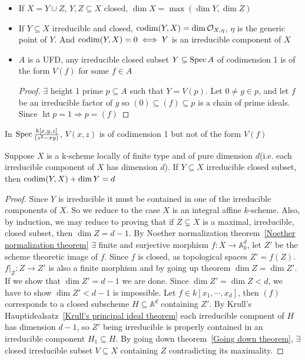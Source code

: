 \documentclass[main]{subfiles}
\begin{document}
\begin{itemize}
\item If $X=Y\cup Z$, $Y,Z\subseteq X$ closed, $\dim X=\max(\dim Y,\dim Z)$
\item If $Y\subseteq X$ irreducible and closed, $\operatorname{codim}(Y,X)=\dim\mathcal O_{X,\eta}$, $\eta$ is the generic point of $Y$. And $\operatorname{codim}(Y,X)=0\iff Y$ is an irreducible component of $X$
\item $A$ is a UFD, any irreducible closed subset $Y\subseteq\operatorname{Spec} A$ of codimension 1 is of the form $V(f)$ for some $f\in A$
\begin{proof}
$\exists$ height 1 prime $p\subseteq A$ such that $Y=V(p)$. Let $0\neq g\in p$, and let $f$ be an irreducible factor of $g$ so $(0)\subseteq(f)\subseteq p$ is a chain of prime ideals. Since $\operatorname{ht}p=1\Rightarrow p=(f)$
\end{proof}
\end{itemize}

\begin{example}
In $\operatorname{Spec}\frac{k[x,y,z]}{(z^2-xy)}$, $V(x,z)$ is of codimension 1 but not of the form $V(f)$
\end{example}

\clubsuit\quad  Suppose $X$ is a k-scheme locally of finite type and of pure dimension $d$(i.e. each irreducible component of $X$ has dimension $d$). If $Y\subseteq X$ irreducible closed subset, then $\operatorname{codim}(Y,X)+\dim Y=d$
\begin{proof}
Since $Y$ is irreducible it must be contained in one of the irreducible components of $X$. So we reduce to the case $X$ is an integral affine $k$-scheme. Also, by induction, we may reduce to proving that if $Z\subsetneq X$ is a maximal, irreducible, closed subset, then $\dim Z=d-1$. By Noether normalization theorem~\ref{Noether normalization theorem} $\exists$ finite and surjective morphism $f:X\to\mathbb A^d_k$, let $Z'$ be the scheme theoretic image of $f$. Since $f$ is closed, as topological spaces $Z'=f(Z)$. $f|_Z:Z\to Z'$ is also a finite morphism and by going up theorem $\dim Z=\dim Z'$. If we show that $\dim Z'=d-1$ we are done. Since $\dim Z'=\dim Z<d$, we have to show $\dim Z'<d-1$ is impossible. Let $f\in k[x_1,\cdots,x_d]$, then $(f)$ corresponds to a closed subscheme $H\subseteq\mathbb A^d$ containing $Z'$. By Krull's Hauptidealsatz~\ref{Krull's principal ideal theorem} each irreducible compnent of $H$ has dimension $d-1$, so $Z'$ being irreducible is properly contained in an irreducible component $H_1\subseteq H$. By going down theorem~\ref{Going down theorem}, $\exists$ closed irreducible subset $V\subseteq X$ containing $Z$ contradicting its maximality.
\end{proof}
\end{document}
